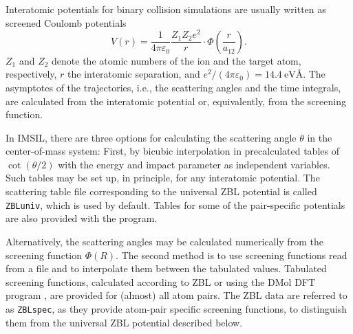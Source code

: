 Interatomic potentials for binary collision simulations are usually written
as screened Coulomb potentials
%
\begin{equation}
   V(r) = \frac{1}{4 \pi \varepsilon_0} \frac{Z_1 Z_2 e^2}{r} 
          \cdot \Phi(\frac{r}{a_{12}}).
   \label{eq:screenedCoulomb}
\end{equation}
%
$Z_1$ and $Z_2$ denote the atomic numbers of the ion and the target atom, 
respectively, $r$ the interatomic separation, and 
$e^2/(4 \pi \varepsilon_0) = 14.4~\mbox{eV\AA}$. The asymptotes of the
trajectories, i.e., the scattering angles and the time integrals, are 
calculated from the interatomic potential or, equivalently, from the
screening function.

In IMSIL, there are three options for calculating the scattering angle
$\theta$ in the center-of-mass system: First, by bicubic interpolation in 
precalculated tables of $\cot(\theta/2)$ \cite{I8730} with the energy and 
impact parameter as independent variables. Such tables 
may be set up, in principle, for any interatomic potential. The scattering 
table file corresponding to the universal ZBL potential \cite{I8512} is 
called \texttt{ZBLuniv}, which is used by default. Tables for some of the 
pair-specific potentials are also provided with the program.
 
Alternatively, the scattering angles may be calculated numerically from
the screening function $\Phi(R)$. The second method is to use screening 
functions read from a file and to interpolate them between the tabulated 
values. Tabulated screening functions, calculated according to ZBL \cite{I8512}
or using the DMol DFT program \cite{I9757}, are provided for (almost) all 
atom pairs. The ZBL data are referred to as \texttt{ZBLspec}, as they provide
atom-pair specific screening functions, to distinguish them from the universal
ZBL potential described below.

